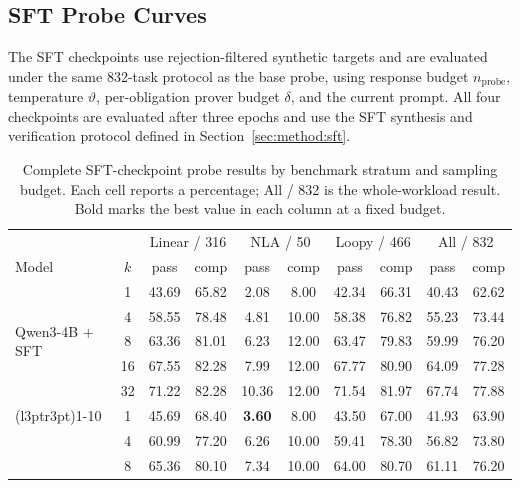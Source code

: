 \subsection{SFT Probe Curves}
\label{app:sft-probe}

The SFT checkpoints use rejection-filtered synthetic targets and are evaluated
under the same 832-task protocol as the base probe, using response budget
\(n_{\mathrm{probe}}\), temperature \(\vartheta\), per-obligation prover
budget \(\delta\), and the current prompt.  All four checkpoints are
evaluated after three epochs and use the SFT synthesis and verification
protocol defined in Section~\ref{sec:method:sft}.

\begin{table}[H]
\centering
\small
\renewcommand{\arraystretch}{0.86}
\caption{Complete SFT-checkpoint probe results by benchmark stratum and
sampling budget.  Each cell reports a percentage; All / 832 is the
whole-workload result.  Bold marks the best value in each column at a fixed
budget.}
\label{tab:sft-probe-complete}
\setlength{\tabcolsep}{2.4pt}
\begin{tabular}{lccccccccc}
\toprule
\rowcolor{algobg}
& & \multicolumn{2}{c}{Linear / 316} & \multicolumn{2}{c}{NLA / 50}
  & \multicolumn{2}{c}{Loopy / 466} & \multicolumn{2}{c}{All / 832} \\
\headercmidrules{\cmidrule(lr){3-4}\cmidrule(lr){5-6}\cmidrule(lr){7-8}\cmidrule(lr){9-10}}
\rowcolor{algobg}
Model & \(k\) & pass & comp & pass & comp & pass & comp & pass & comp
  \\
\midrule
\multirow{5}{*}{Qwen3-4B + SFT}
 & 1  & 43.69 & 65.82 & 2.08 & 8.00  & 42.34 & 66.31 & 40.43 & 62.62 \\
 & 4  & 58.55 & 78.48 & 4.81 & 10.00 & 58.38 & 76.82 & 55.23 & 73.44 \\
 & 8  & 63.36 & 81.01 & 6.23 & 12.00 & 63.47 & 79.83 & 59.99 & 76.20 \\
 & 16 & 67.55 & 82.28 & 7.99 & 12.00 & 67.77 & 80.90 & 64.09 & 77.28 \\
 & 32 & 71.22 & 82.28 & 10.36 & 12.00 & 71.54 & 81.97 & 67.74 & 77.88 \\
\cmidrule(l{3pt}r{3pt}){1-10}
\multirow{5}{*}{Qwen3-8B + SFT}
 & 1  & 45.69 & 68.40 & \textbf{3.60} & 8.00 & 43.50 & 67.00 & 41.93 & 63.90 \\
 & 4  & 60.99 & 77.20 & 6.26 & 10.00 & 59.41 & 78.30 & 56.82 & 73.80 \\
 & 8  & 65.36 & 80.10 & 7.34 & 10.00 & 64.00 & 80.70 & 61.11 & 76.20 \\

\end{tabular}
\end{table}
